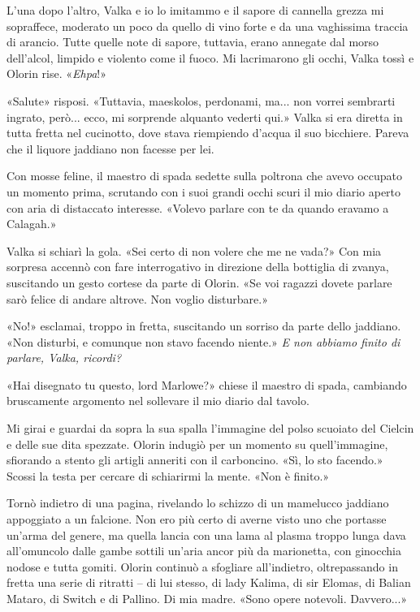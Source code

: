 L'una dopo l'altro, Valka e io lo imitammo e il sapore di cannella
grezza mi sopraffece, moderato un poco da quello di vino forte e da una
vaghissima traccia di arancio. Tutte quelle note di sapore, tuttavia,
erano annegate dal morso dell'alcol, limpido e violento come il fuoco.
Mi lacrimarono gli occhi, Valka tossì e Olorin rise. «\emph{Ehpa}!»

«Salute» risposi. «Tuttavia, maeskolos, perdonami, ma... non vorrei
sembrarti ingrato, però... ecco, mi sorprende alquanto vederti qui.»
Valka si era diretta in tutta fretta nel cucinotto, dove stava
riempiendo d'acqua il suo bicchiere. Pareva che il liquore jaddiano non
facesse per lei.

Con mosse feline, il maestro di spada sedette sulla poltrona che avevo
occupato un momento prima, scrutando con i suoi grandi occhi scuri il
mio diario aperto con aria di distaccato interesse. «Volevo parlare con
te da quando eravamo a Calagah.»

Valka si schiarì la gola. «Sei certo di non volere che me ne vada?» Con
mia sorpresa accennò con fare interrogativo in direzione della bottiglia
di zvanya, suscitando un gesto cortese da parte di Olorin. «Se voi
ragazzi dovete parlare sarò felice di andare altrove. Non voglio
disturbare.»

«No!» esclamai, troppo in fretta, suscitando un sorriso da parte dello
jaddiano. «Non disturbi, e comunque non stavo facendo niente.» \emph{E
	non abbiamo finito di parlare, Valka, ricordi?}

«Hai disegnato tu questo, lord Marlowe?» chiese il maestro di spada,
cambiando bruscamente argomento nel sollevare il mio diario dal tavolo.

Mi girai e guardai da sopra la sua spalla l'immagine del polso scuoiato
del Cielcin e delle sue dita spezzate. Olorin indugiò per un momento su
quell'immagine, sfiorando a stento gli artigli {anneriti} con il
carboncino. «Sì, lo sto facendo.» Scossi la testa per cercare di
schiarirmi la mente. «Non è finito.»

Tornò indietro di una pagina, rivelando lo schizzo di un mamelucco
jaddiano appoggiato a un falcione. Non ero più certo di averne visto uno
che portasse un'arma del genere, ma quella lancia con una lama al plasma
troppo lunga dava all'omuncolo dalle gambe sottili un'aria ancor più da
marionetta, con ginocchia nodose e tutta gomiti. Olorin continuò a
sfogliare all'indietro, oltrepassando in fretta una serie di ritratti --
di lui stesso, di lady Kalima, di sir Elomas, di Balian Mataro, di
Switch e di Pallino. Di mia madre. «Sono opere notevoli. Davvero...»

